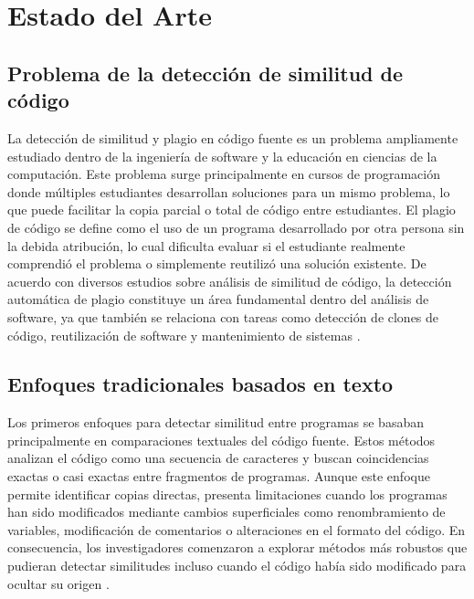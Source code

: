 \chapter{Estado del Arte}

\section{Problema de la detección de similitud de código}

La detección de similitud y plagio en código fuente es un problema ampliamente estudiado dentro de la ingeniería de software y la educación en ciencias de la computación. Este problema surge principalmente en cursos de programación donde múltiples estudiantes desarrollan soluciones para un mismo problema, lo que puede facilitar la copia parcial o total de código entre estudiantes. El plagio de código se define como el uso de un programa desarrollado por otra persona sin la debida atribución, lo cual dificulta evaluar si el estudiante realmente comprendió el problema o simplemente reutilizó una solución existente. De acuerdo con diversos estudios sobre análisis de similitud de código, la detección automática de plagio constituye un área fundamental dentro del análisis de software, ya que también se relaciona con tareas como detección de clones de código, reutilización de software y mantenimiento de sistemas \cite{Zakeri2023Systematic}.

\section{Enfoques tradicionales basados en texto}

Los primeros enfoques para detectar similitud entre programas se basaban principalmente en comparaciones textuales del código fuente. Estos métodos analizan el código como una secuencia de caracteres y buscan coincidencias exactas o casi exactas entre fragmentos de programas. Aunque este enfoque permite identificar copias directas, presenta limitaciones cuando los programas han sido modificados mediante cambios superficiales como renombramiento de variables, modificación de comentarios o alteraciones en el formato del código. En consecuencia, los investigadores comenzaron a explorar métodos más robustos que pudieran detectar similitudes incluso cuando el código había sido modificado para ocultar su origen \cite{Roy2007Survey}.

